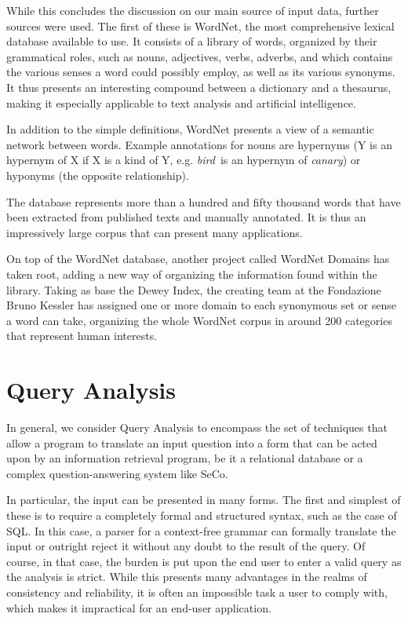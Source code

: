 While this concludes the discussion on our main source of input data, further sources were used. The first of these is WordNet, the most comprehensive lexical database available to use. It consists of a library of words, organized by their grammatical roles, such as nouns, adjectives, verbs, adverbs, and which contains the various senses a word could possibly employ, as well as its various synonyms. It thus presents an interesting compound between a dictionary and a thesaurus, making it especially applicable to text analysis and artificial intelligence.

In addition to the simple definitions, WordNet presents a view of a semantic network between words. Example annotations for nouns are hypernyms (Y is an hypernym of X if X is a kind of Y, e.g. \emph{bird}\ is an hypernym of \emph{canary}) or hyponyms (the opposite relationship).

The database represents more than a hundred and fifty thousand words that have been extracted from published texts and manually annotated. It is thus an impressively large corpus that can present many applications.

On top of the WordNet database, another project called WordNet Domains has taken root, adding a new way of organizing the information found within the library. Taking as base the Dewey Index, the creating team at the Fondazione Bruno Kessler has assigned one or more domain to each synonymous set or sense a word can take, organizing the whole WordNet corpus in around 200 categories that represent human interests.

\section{Query Analysis} %
\label{sec:query_analysis}

In general, we consider Query Analysis to encompass the set of techniques that allow a program to translate an input question into a form that can be acted upon by an information retrieval program, be it a relational database or a complex question-answering system like SeCo.

In particular, the input can be presented in many forms. The first and simplest of these is to require a completely formal and structured syntax, such as the case of SQL. In this case, a parser for a context-free grammar can formally translate the input or outright reject it without any doubt to the result of the query. Of course, in that case, the burden is put upon the end user to enter a valid query as the analysis is strict. While this presents many advantages in the realms of consistency and reliability, it is often an impossible task a user to comply with, which makes it impractical for an end-user application.

